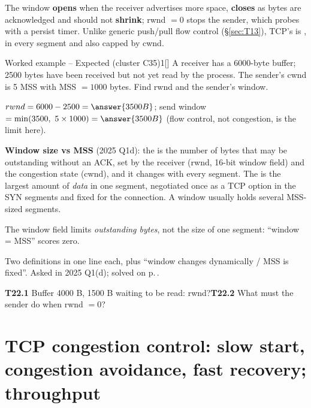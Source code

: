 The window \textbf{opens} when the receiver advertises more space, \textbf{closes} as bytes are acknowledged and should not \textbf{shrink}; rwnd $=0$ stops the sender, which probes with a persist timer. Unlike generic push/pull flow control (\S\ref{sec:T13}), TCP's is ,  in every segment and also capped by cwnd.

\begin{question}{Worked example -- Expected (cluster C35)}{1}[]
A receiver has a 6000-byte buffer; 2500 bytes have been received but not yet read by the process. The sender's cwnd is 5 MSS with MSS $=1000$ bytes. Find rwnd and the sender's window.
\end{question}
\begin{solution}
$rwnd=6000-2500=\answer{3500 B}$; send window $=\min(3500,\ 5\times1000)=\answer{3500 B}$ (flow control, not congestion, is the limit here).
\end{solution}

\textbf{Window size vs MSS} (2025 Q1d): the  is the number of bytes that may be outstanding without an ACK, set by the receiver (rwnd, 16-bit window field) and the congestion state (cwnd), and it changes with every segment. The  is the largest amount of \emph{data} in one segment, negotiated once as a TCP option in the SYN segments and fixed for the connection. A window usually holds several MSS-sized segments.

\begin{warningbox}
The window field limits \emph{outstanding bytes}, not the size of one segment: ``window = MSS'' scores zero.
\end{warningbox}

\begin{answerplan}[1 mark]
Two definitions in one line each, plus ``window changes dynamically / MSS is fixed''. Asked in 2025 Q1(d); solved on p.\,\pageref{q:MS2025-1d}.
\par{} \textbf{T22.1} Buffer 4000 B, 1500 B waiting to be read: rwnd?\quad \textbf{T22.2} What must the sender do when rwnd $=0$?
\end{answerplan}

\section{TCP congestion control: slow start, congestion avoidance, fast recovery; throughput}\label{sec:T23}
  

